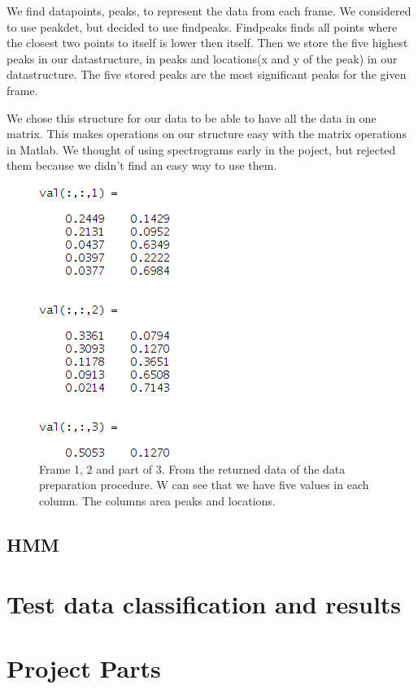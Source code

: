 \documentclass[titlepage]{article}
\begin{document}
We find datapoints, peaks, to represent the data from each frame. We considered to use peakdet, but decided to use findpeaks. Findpeaks finds all points where the closest two points to itself is lower then itself. Then we store the five highest peaks in our datastructure, in peaks and locations(x and y of the peak) in our datastructure. The five stored peaks are the most significant peaks for the given frame. 

We chose this structure for our data to be able to have all the data in one matrix. This makes operations on our structure easy with the matrix operations in Matlab. We thought of using spectrograms early in the poject, but rejected them because we didn't find an easy way to use them. 

\begin{figure}[Data Structure]
  \centering
    \includegraphics[height=60mm\textwidth]{data_part1}
  \caption{Frame 1, 2 and part of 3. From the returned data of the data preparation procedure. W can see that we have five values in each column. The columns area peaks and locations.}
\end{figure}

    \subsection{HMM}

  
\section{Test data classification and results}


\section{Project Parts}
\end{document}
